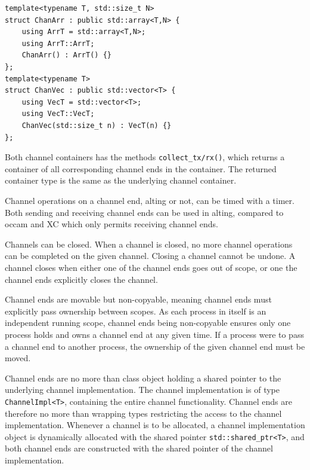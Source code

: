 \begin{lstfloat}
\begin{lstlisting}[caption={Channel container types.}, label={lst:channel_container_types}, style={CustomC++}, xleftmargin={2em}]
template<typename T, std::size_t N>
struct ChanArr : public std::array<T,N> {
    using ArrT = std::array<T,N>;
    using ArrT::ArrT;
    ChanArr() : ArrT() {}
};
template<typename T>
struct ChanVec : public std::vector<T> {
    using VecT = std::vector<T>;
    using VecT::VecT;
    ChanVec(std::size_t n) : VecT(n) {}
};
\end{lstlisting}
\end{lstfloat}

Both channel containers has the methods \lstinline[style={CustomC++}]|collect_tx/rx()|, which returns a container of all corresponding channel ends in the container. The returned container type is the same as the underlying channel container.

Channel operations on a channel end, alting or not, can be timed with a timer. Both sending and receiving channel ends can be used in alting, compared to occam and XC which only permits receiving channel ends.

Channels can be closed. When a channel is closed, no more channel operations can be completed on the given channel. Closing a channel cannot be undone. A channel closes when either one of the channel ends goes out of scope, or one the channel ends explicitly closes the channel.

Channel ends are movable but non\hyp{}copyable, meaning channel ends must explicitly pass ownership between scopes. As each process in itself is an independent running scope, channel ends being non\hyp{}copyable ensures only one process holds and owns a channel end at any given time. If a process were to pass a channel end to another process, the ownership of the given channel end must be moved.

Channel ends are no more than class object holding a shared pointer to the underlying channel implementation. The channel implementation is of type \lstinline[style={CustomC++}]|ChannelImpl<T>|, containing the entire channel functionality. Channel ends are therefore no more than wrapping types restricting the access to the channel implementation. Whenever a channel is to be allocated, a channel implementation object is dynamically allocated with the shared pointer \lstinline[style={CustomC++}]|std::shared_ptr<T>|, and both channel ends are constructed with the shared pointer of the channel implementation.

